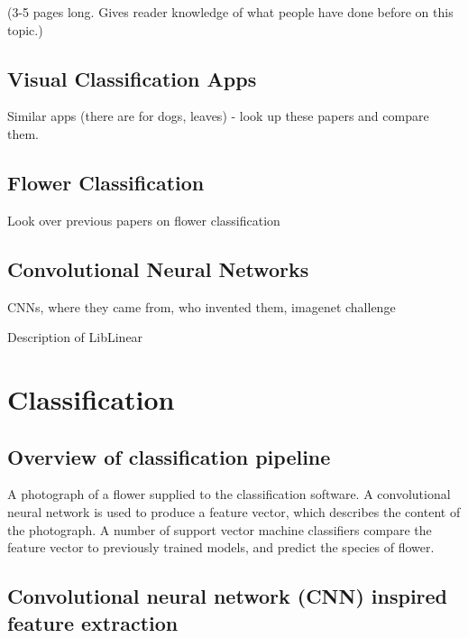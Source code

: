 \documentclass[11pt, a4paper]{report}
\begin{document}
(3-5 pages long. Gives reader knowledge of what people have done before on this topic.) 

\section{Visual Classification Apps}

Similar apps (there are for dogs, leaves) - look up these papers and compare them.

\section{Flower Classification}

Look over previous papers on flower classification

\section{Convolutional Neural Networks}

CNNs, where they came from, who invented them, imagenet challenge


Description of LibLinear













\chapter{Classification}

\section{Overview of classification pipeline}

A photograph of a flower supplied to the classification software. A convolutional neural network is used to produce a feature vector, which describes the content of the photograph. A number of support vector machine classifiers compare the feature vector to previously trained models, and predict the species of flower. 

\section{Convolutional neural network (CNN) inspired feature extraction}
\end{document}
